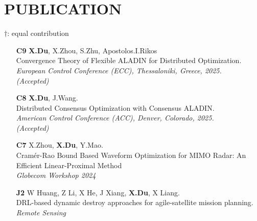 \documentclass[paper=a4,fontsize=11pt]{scrartcl} %
\newcommand{\NewPart}[1]{\section*{\uppercase{#1}}}
\newcommand{\EducationEntry}[4]{
	\noindent \textbf{#1} \hfill      %
	\colorbox{White}{%
		\parbox{5cm}{%
			\hfill\color{Black}#2}} \par  %
	\noindent \textit{#3} \par        %
	\noindent\hangindent=2em\hangafter=0 \small #4 %
	\normalsize \par}
\begin{document}
		
		\NewPart{PUBLICATION}{}
		$\dag$:  equal contribution
		\begin{itemize}
			
			
			\item [\textbf{C9}]   {\textbf{X.Du}, X.Zhou, S.Zhu, Apostolos.I.Rikos \\
				{ Convergence Theory of Flexible ALADIN for Distributed Optimization.}\\
				\emph{European Control Conference (ECC), Thessaloniki, Greece, 2025.\\(Accepted)
			} }
			
			\item [\textbf{C8}]   {\textbf{X.Du}, J.Wang. \\
				{ Distributed Consensus Optimization with Consensus ALADIN.}\\
				\emph{American Control Conference (ACC), Denver, Colorado, 2025.\\(Accepted)
			} }
			
		
			\item [\textbf{C7}]   {X.Zhou, \textbf{X.Du},   Y.Mao. \\
				{Cram\'er-Rao Bound Based Waveform Optimization for MIMO Radar: An Efficient Linear-Proximal Method}\\
				\emph{Globecom Workshop 2024
			} }
			
		
			
			
			\item [\textbf{J2}]   {W Huang, Z Li, X He, J Xiang, \textbf{X.Du}, X Liang. \\
				{DRL-based dynamic destroy approaches for agile-satellite mission planning.}\\
				\emph{Remote Sensing\\
			} }
			

\end{itemize}
\end{document}
